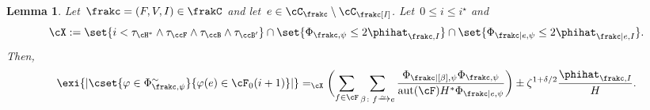\documentclass[11pt]{amsart}
\DeclarePairedDelimiter{\paren}{\lparen}{\rparen}
\DeclarePairedDelimiter{\abs}{\lvert}{\rvert}
\newcommand{\Xeq}{=_{\cX}}
\def\phi{\varphi}
\newcommand{\bijection}{\mathchoice
	{\xrightarrow{\smash{\raisebox{-3pt}{$\scriptstyle\sim$}}}}%
	{\xrightarrow{\smash{\raisebox{-3pt}{$\scriptstyle\sim$}}}}%
	{\xrightarrow{\smash{\raisebox{-2.5pt}{$\scriptscriptstyle\sim$}}}}%
	{\xrightarrow{\smash{\raisebox{-2.5pt}{$\scriptscriptstyle\sim$}}}}%
}
\DeclareMathOperator{\aut}{aut}
\newtheorem{lemma}[algocf]{Lemma}
\theoremstyle{definition}
\numberwithin{equation}{section}
\begin{document}
	\begin{lemma}\label{lemma: ladder averaging}
		Let~$\frakc=(F,V,I)\in\frakC$ and let~$e\in \cC_\frakc\setminus\cC_\frakc[I]$.
		Let~$0\leq i\leq i^\star$ and
		\begin{equation*}
			\cX:=\set{i<\tau_{\cH^*}\wedge \tau_{\ccF}\wedge \tau_{\ccB}\wedge \tau_{\ccB'} }\cap \set{ \Phi_{\frakc,\psi}\leq 2\phihat_{\frakc,I} }\cap \set{ \Phi_{\frakc|e,\psi}\leq 2\phihat_{\frakc|e,I} }.
		\end{equation*}
		Then,
		\begin{equation*}
			\exi{\abs{\cset{ \phi\in\Phi^\sim_{\frakc,\psi} }{ \phi(e)\in \cF_0(i+1) }}}
			\Xeq \paren[\bigg]{\sum_{f\in\cF}\sum_{\beta\colon f\bijection e}\frac{\Phi_{\frakc|[\beta],\psi}\Phi_{\frakc,\psi} }{\aut(\cF)H^*\Phi_{\frakc|e,\psi}}}\pm \zeta^{1+\delta/2}\frac{\phihat_{\frakc,I}}{H}.
		\end{equation*}
	\end{lemma}
	
\end{document}
